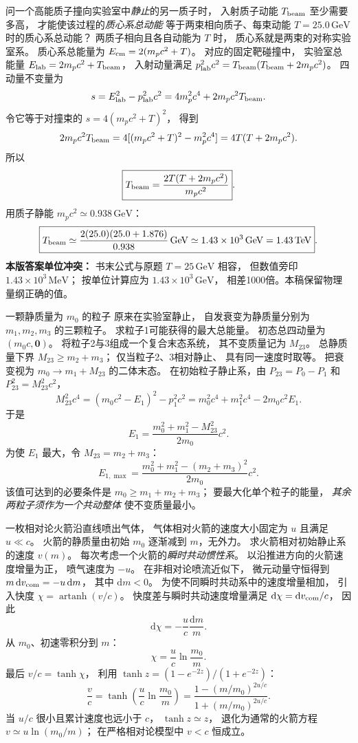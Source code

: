 问一个高能质子撞向实验室中\emph{静止}的另一质子时，
入射质子动能 $T_{\rm beam}$ 至少需要多高，
才能使该过程的\emph{质心系总动能}
等于两束相向质子、每束动能
$T=25.0\,\mathrm{GeV}$ 时的质心系总动能？
\exsolution
两质子相向且各自动能为 $T$ 时，
质心系就是两束的对称实验室系。
质心系总能量为
$E_{\rm cm}=2(m_pc^2+T)$。
对应的固定靶碰撞中，
实验室总能量
$E_{\rm lab}=2m_pc^2+T_{\rm beam}$，
入射动量满足
$p_{\rm lab}^2c^2
=T_{\rm beam}(T_{\rm beam}+2m_pc^2)$。
四动量不变量为
\[
s=E_{\rm lab}^2-p_{\rm lab}^2c^2
=4m_p^2c^4+2m_pc^2T_{\rm beam}.
\]
令它等于对撞束的
$s=4(m_pc^2+T)^2$，
得到
\[
2m_pc^2T_{\rm beam}
=4[(m_pc^2+T)^2-m_p^2c^4]
=4T(T+2m_pc^2).
\]
所以
\[
\boxed{T_{\rm beam}=
\frac{2T(T+2m_pc^2)}{m_pc^2}}.
\]
用质子静能 $m_pc^2\simeq0.938\,\mathrm{GeV}$：
\[
\boxed{T_{\rm beam}
\simeq\frac{2(25.0)(25.0+1.876)}{0.938}
\,\mathrm{GeV}\simeq1.43\times10^3\,\mathrm{GeV}
=1.43\,\mathrm{TeV}}.
\]
\excheck \textbf{本版答案单位冲突：}
书末公式与原题 $T=25\,\mathrm{GeV}$ 相容，
但数值旁印 $1.43\times10^3\,\mathrm{MeV}$；
按单位计算应为
$1.43\times10^3\,\mathrm{GeV}$，
相差1000倍。本稿保留物理量纲正确的值。

一颗静质量为 $m_0$ 的粒子
原来在实验室静止，
自发衰变为静质量分别为
$m_1,m_2,m_3$ 的三颗粒子。
求粒子1可能获得的最大总能量。
\exsolution
初态总四动量为
$(m_0c,\bm0)$。
将粒子2与3组成一个复合末态系统，
其不变质量记为 $M_{23}$。
总静质量下界
$M_{23}\ge m_2+m_3$；
仅当粒子2、3相对静止、
具有同一速度时取等。
把衰变视为
$m_0\to m_1+M_{23}$ 的二体末态。
在初始粒子静止系，由
$P_{23}=P_0-P_1$ 和
$P_{23}^2=M_{23}^2c^2$，
\[
M_{23}^2c^4
=(m_0c^2-E_1)^2-p_1^2c^2
=m_0^2c^4+m_1^2c^4-2m_0c^2E_1.
\]
于是
\[
E_1=
\frac{m_0^2+m_1^2-M_{23}^2}{2m_0}c^2.
\]
为使 $E_1$ 最大，令 $M_{23}=m_2+m_3$：
\[
\boxed{E_{1,\max}=
\frac{m_0^2+m_1^2-(m_2+m_3)^2}{2m_0}c^2}.
\]
\excheck 该值可达到的必要条件是
$m_0\ge m_1+m_2+m_3$；
要最大化单个粒子的能量，
\emph{其余两粒子须作为一个共动整体}
使不变质量最小。

一枚相对论火箭沿直线喷出气体，
气体相对火箭的速度大小固定为
$u$ 且满足 $u\ll c$。
火箭的静质量由初始 $m_0$
逐渐减到 $m$，无外力。
求火箭相对初始静止系的速度 $v(m)$。
\exsolution
每次考虑一个火箭的\emph{瞬时共动惯性系}。
以沿推进方向的火箭速度增量为正，
喷气速度为 $-u$。
在非相对论喷流近似下，
微元动量守恒得到
$m\,\mathrm dv_{\rm com}=-u\,\mathrm dm$，
其中 $\mathrm dm<0$。
为使不同瞬时共动系中的速度增量相加，
引入快度
$\chi=\operatorname{artanh}(v/c)$。
快度差与瞬时共动速度增量满足
$\mathrm d\chi=\mathrm dv_{\rm com}/c$，
因此
\[
\mathrm d\chi=-\frac{u}{c}\frac{\mathrm dm}{m}.
\]
从 $m_0$、初速零积分到 $m$：
\[
\chi=\frac uc\ln\frac{m_0}{m}.
\]
最后 $v/c=\tanh\chi$，
利用
$\tanh z=(1-e^{-2z})/(1+e^{-2z})$：
\[
\boxed{\frac vc=
\tanh\!\left(\frac uc\ln\frac{m_0}{m}\right)
=\frac{1-(m/m_0)^{2u/c}}
{1+(m/m_0)^{2u/c}}}.
\]
\excheck 当 $u/c$ 很小且累计速度也远小于 $c$，
$\tanh z\simeq z$，
退化为通常的火箭方程
$v\simeq u\ln(m_0/m)$；
在严格相对论模型中 $v<c$ 恒成立。
